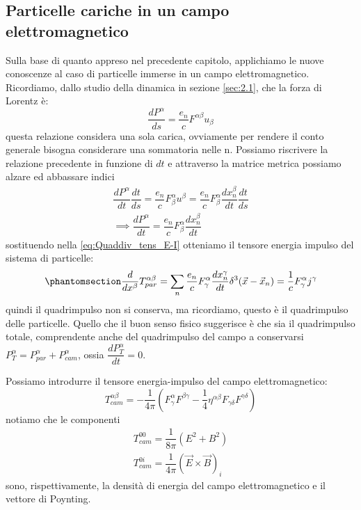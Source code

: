 \subsection{Particelle cariche in un campo elettromagnetico}
Sulla base di quanto appreso nel precedente capitolo, applichiamo le nuove conoscenze al caso di particelle immerse in un campo elettromagnetico. Ricordiamo, dallo studio della dinamica in sezione \ref{sec:2.1}, che la forza di Lorentz è:
\begin{equation}
     \dfrac{dP^\alpha}{ds}=\dfrac{e_n}{c}F^{\alpha\beta}u_\beta
\end{equation}
questa relazione considera una sola carica, ovviamente per rendere il conto generale bisogna considerare una sommatoria nelle n.
Possiamo riscrivere la relazione precedente in funzione di $dt$ e attraverso la matrice metrica possiamo alzare ed abbassare indici
\begin{equation}
\begin{gathered}
     \dfrac{dP^\alpha}{dt}\dfrac{dt}{ds}=\dfrac{e_n}{c}F^\alpha_\beta u^\beta=\dfrac{e_n}{c}F^\alpha_\beta \dfrac{dx_n^\beta}{dt}\dfrac{dt}{ds}\\
     \implies\dfrac{dP^\alpha}{dt}=\dfrac{e_n}{c}F^\alpha_\beta \dfrac{dx_n^\beta}{dt}
\end{gathered}
\end{equation}
sostituendo nella \eqref{eq:Quaddiv_tens_E-I} otteniamo il tensore energia impulso del sistema di particelle:
\begin{equation}\phantomsection\label{eq:tens_par}
 \dfrac{d}{dx^\beta}T^{\alpha \beta}_{par}=\sum_n\dfrac{e_n}{c}F^\alpha_\gamma \dfrac{dx_n^\gamma}{dt}\delta^3(\Vec{x}-\Vec{x}_n)=\dfrac{1}{c}F^\alpha_\gamma j^\gamma
\end{equation}
quindi il quadrimpulso non si conserva, ma ricordiamo, questo è il quadrimpulso delle particelle. Quello che il buon senso fisico suggerisce è che sia il quadrimpulso totale, comprendente anche del quadrimpulso del campo a conservarsi $P^\alpha_T=P^\alpha_{par}+P^\alpha_{cam}$, ossia $\dfrac{dP^\alpha_T}{dt}=0$.

Possiamo introdurre il tensore energia-impulso del campo elettromagnetico:
\begin{equation}
 T^{\alpha \beta}_{cam}=-\dfrac{1}{4\pi}\left(F^\alpha_\gamma F^{\beta\gamma}- \dfrac{1}{4}\eta^{\alpha\beta}F_{\gamma\delta} F^{\gamma\delta} \right)
\end{equation}
notiamo che le componenti 
\begin{equation}
    \begin{gathered}
        T^{00}_{cam}=\dfrac{1}{8\pi}(E^2+B^2)\\
        T^{0i}_{cam}=\dfrac{1}{4\pi}(\Vec{E}\times\Vec{B})_i
    \end{gathered}
\end{equation}
sono, rispettivamente, la densità di energia del campo elettromagnetico e il vettore di Poynting. 

